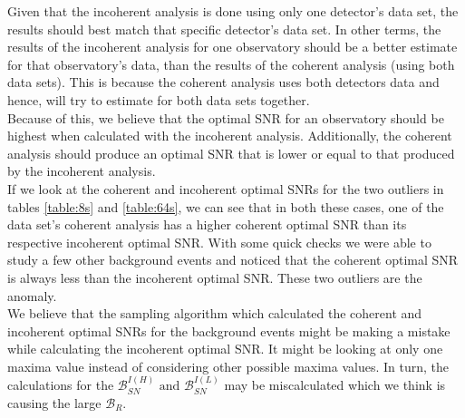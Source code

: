 \documentclass{article}
\begin{document}
 
 
 
 
 Given that the incoherent analysis is done using only one detector's data set, the results should best match that specific detector's data set. In other terms, the results of the incoherent analysis for one observatory should be a better estimate for that observatory's data, than the results of the coherent analysis (using both data sets). This is because the coherent analysis uses both detectors data and hence, will try to estimate for both data sets together. \\
 
 Because of this, we believe that the optimal SNR for an observatory should be highest when calculated with the incoherent analysis. Additionally, the coherent analysis should produce an optimal SNR that is lower or equal to that produced by the incoherent analysis.\\
 
 If we look at the coherent and incoherent optimal SNRs for the two outliers in tables \ref{table:8s} and \ref{table:64s}, we can see that in both these cases, one of the data set's coherent analysis has a higher coherent optimal SNR than its respective incoherent optimal SNR. With some quick checks we were able to study a few other background events and noticed that the coherent optimal SNR is always less than the incoherent optimal SNR. These two outliers are the anomaly. \\
 
 We believe that the sampling algorithm which calculated the coherent and incoherent optimal SNRs for the background events might be making a mistake while calculating the incoherent optimal SNR. It might be looking at only one maxima value instead of considering other possible maxima values. In turn, the calculations for the $\mathcal{B}_{SN}^{I(H)}\text{ and }\mathcal{B}_{SN}^{I(L)}$ may be miscalculated which we think is causing the large $\mathcal{B}_{R}$.
 
\end{document}
